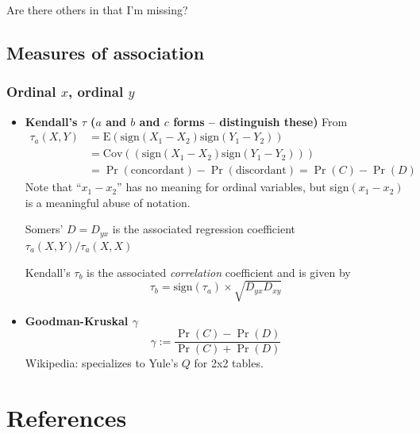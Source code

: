 \documentclass[
  11pt,
  fleqn
]{article}
\begin{document}
  Are there others in \citet{agrestiAnalysisOrdinalCategorical2010}
  that I'm missing?

  \subsection{Measures of association}

  \subsubsection{Ordinal $x$, ordinal $y$}

  \begin{itemize}
    \item \textbf{Kendall's $\tau$ ($a$ and $b$ and $c$ forms --
      \textbf{distinguish these})}
      From \citet{newsonParametersNonparametricStatistics2002}
      \begin{align*}
        \tau_a(X,Y)
        &= \mathrm{E}\left(\text{sign}(X_1-X_2)\text{sign}(Y_1-Y_2)\right) \\
        &=
        \mathrm{Cov}(\left(\text{sign}(X_1-X_2)\text{sign}(Y_1-Y_2)\right)) \\
        &= \Pr\left(\text{concordant}\right) -
        \Pr\left(\text{discordant}\right) = \Pr\left(C\right) -
        \Pr\left(D\right)
      \end{align*}
      Note that ``$x_1 - x_2$'' has no meaning for ordinal variables, but
      sign$(x_1 - x_2)$ is a meaningful abuse of notation.

      Somers' $D = D_{yx}$ is the associated regression coefficient
      $\tau_a(X, Y)/\tau_a(X, X)$

      Kendall's $\tau_b$ is the associated \emph{correlation} coefficient
      and is given by
      \[
        \tau_b = \text{sign}(\tau_a) \times \sqrt{D_{yx} D_{xy}}
      \]

    \item \textbf{Goodman-Kruskal $\gamma$} \[\gamma :=\frac{\Pr(C) -
      \Pr(D)}{\Pr(C) + \Pr(D)}\] Wikipedia: specializes to Yule's $Q$
      for 2x2 tables.

  \end{itemize}

  \newpage

  \section{References}
  \printbibliography

  
\end{document}
